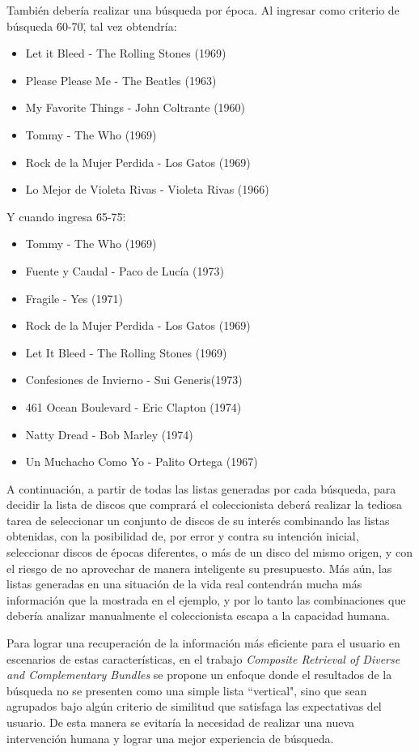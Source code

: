También debería realizar una búsqueda por época. Al ingresar como criterio de búsqueda \"60-70\", tal vez obtendría:
\begin{itemize}
	\item Let it Bleed - The Rolling Stones (1969)
	\item Please Please Me - The Beatles (1963)
	\item My Favorite Things - John Coltrante (1960)
	\item Tommy - The Who (1969)
	\item Rock de la Mujer Perdida - Los Gatos (1969)
	\item Lo Mejor de Violeta Rivas - Violeta Rivas (1966)
\end{itemize}

Y cuando ingresa \"65-75\":
\begin{itemize}
	\item Tommy - The Who (1969)
	\item Fuente y Caudal - Paco de Lucía (1973)
	\item Fragile - Yes (1971)
	\item Rock de la Mujer Perdida - Los Gatos (1969)
	\item Let It Bleed - The Rolling Stones (1969)
	\item Confesiones de Invierno - Sui Generis(1973)
	\item 461 Ocean Boulevard - Eric Clapton (1974)
	\item Natty Dread - Bob Marley (1974)
	\item Un Muchacho Como Yo - Palito Ortega (1967)
\end{itemize}


A continuaci\'on, a partir de todas las listas generadas por cada b\'usqueda, para decidir la lista de discos que comprar\'a el coleccionista deber\'a realizar la tediosa tarea de seleccionar un conjunto de discos de su inter\'es combinando las listas obtenidas, con la posibilidad de, por error y contra su intenci\'on inicial, seleccionar discos de  \'epocas diferentes, o m\'as de un disco del mismo origen, y con el riesgo de no aprovechar de manera inteligente su presupuesto. M\'as a\'un, las listas generadas en una situaci\'on de la vida real contendr\'an mucha m\'as informaci\'on que la mostrada en el ejemplo, y por lo tanto las combinaciones que deber\'ia analizar manualmente el coleccionista escapa a la capacidad humana. 

Para lograr una recuperaci\'on de la informaci\'on m\'as eficiente para el usuario en escenarios de estas caracter\'isticas, en el trabajo {\em Composite Retrieval of Diverse and Complementary Bundles} \cite{compositeRetrival} se propone un enfoque donde el resultados de la b\'usqueda no se presenten como una simple lista ``vertical", sino que sean agrupados bajo alg\'un criterio de similitud que satisfaga las expectativas del usuario. De esta manera se evitar\'ia la necesidad de realizar una nueva intervenci\'on humana y lograr una mejor experiencia de b\'usqueda.

